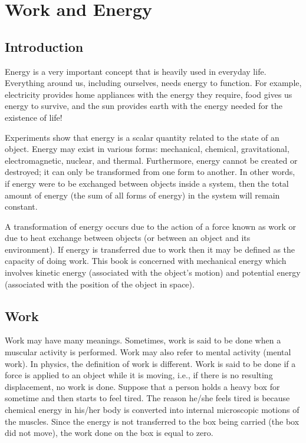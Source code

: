 \documentclass[10pt]{article}
\numberwithin{equation}{section}
\begin{document}
\section{Work and Energy}\label{chap:4}
\subsection{Introduction}\label{sec:4-1}
Energy is a very important concept that is heavily used in everyday life. Everything around us, including ourselves, needs energy to function. For example, electricity provides home appliances with the energy they require, food gives us energy to survive, and the sun provides earth with the energy needed for the existence of life!

Experiments show that energy is a scalar quantity related to the state of an object. Energy may exist in various forms: mechanical, chemical, gravitational, electromagnetic, nuclear, and thermal. Furthermore, energy cannot be created or destroyed; it can only be transformed from one form to another. In other words, if energy were to be exchanged between objects inside a system, then the total amount of energy (the sum of all forms of energy) in the system will remain constant.

A transformation of energy occurs due to the action of a force known as work or due to heat exchange between objects (or between an object and its environment). If energy is transferred due to work then it may be defined as the capacity of doing work. This book is concerned with mechanical energy which involves kinetic energy (associated with the object's motion) and potential energy (associated with the position of the object in space).

\subsection{Work}\label{sec:4-2}
Work may have many meanings. Sometimes, work is said to be done when a muscular activity is performed. Work may also refer to mental activity (mental work). In physics, the definition of work is different. Work is said to be done if a force is applied to an object while it is moving, i.e., if there is no resulting displacement, no work is done. Suppose that a person holds a heavy box for sometime and then starts to feel tired. The reason he/she feels tired is because chemical energy in his/her body is converted into internal microscopic motions of the muscles. Since the energy is not transferred to the box being carried (the box did not move), the work done on the box is equal to zero.
\end{document}
